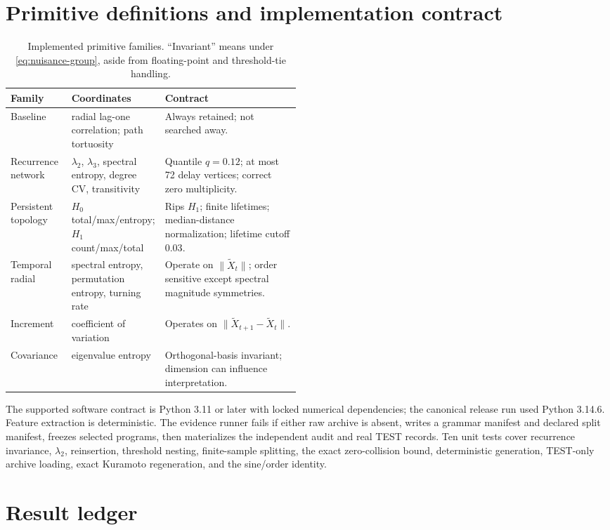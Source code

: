 \documentclass[10pt]{article}
\theoremstyle{definition}
\theoremstyle{remark}
\begin{document}
\section{Primitive definitions and implementation contract}

\begin{table}[H]
\centering
\caption{Implemented primitive families. ``Invariant'' means under \cref{eq:nuisance-group}, aside from floating-point and threshold-tie handling.}
\label{tab:primitives}
\small
\begin{tabularx}{\linewidth}{@{}p{0.21\linewidth}p{0.27\linewidth}X@{}}
\toprule
Family & Coordinates & Contract\\
\midrule
Baseline & radial lag-one correlation; path tortuosity & Always retained; not searched away.\\
Recurrence network & $\lambda_2$, $\lambda_3$, spectral entropy, degree CV, transitivity & Quantile $q=0.12$; at most 72 delay vertices; correct zero multiplicity.\\
Persistent topology & $H_0$ total/max/entropy; $H_1$ count/max/total & Rips $H_1$; finite lifetimes; median-distance normalization; lifetime cutoff $0.03$.\\
Temporal radial & spectral entropy, permutation entropy, turning rate & Operate on $\|\widetilde X_t\|$; order sensitive except spectral magnitude symmetries.\\
Increment & coefficient of variation & Operates on $\|\widetilde X_{t+1}-\widetilde X_t\|$.\\
Covariance & eigenvalue entropy & Orthogonal-basis invariant; dimension can influence interpretation.\\
\bottomrule
\end{tabularx}
\end{table}

The supported software contract is Python 3.11 or later with locked numerical dependencies; the canonical release run used Python 3.14.6. Feature extraction is deterministic. The evidence runner fails if either raw archive is absent, writes a grammar manifest and declared split manifest, freezes selected programs, then materializes the independent audit and real TEST records. Ten unit tests cover recurrence invariance, $\lambda_2$, reinsertion, threshold nesting, finite-sample splitting, the exact zero-collision bound, deterministic generation, TEST-only archive loading, exact Kuramoto regeneration, and the sine/order identity.

\section{Result ledger}
\end{document}
